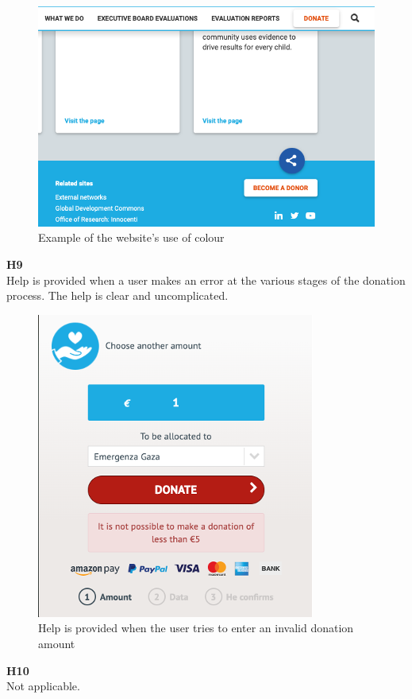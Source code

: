 \begin{description}
    \begin{figure}[htp!]
        \centering
        \includegraphics[scale=0.7]{Resources/Harry/Harry_H8.png}
        \caption{Example of the website's use of colour}
    \end{figure}
    \newpage
    \item {\textbf{H9} \color{unicefGray}{Help users recognize, diagnose and recover from errors}}\\
    Help is provided when a user makes an error at the various stages of the donation process. The help is clear and uncomplicated.
    \begin{figure}[htp!]
        \centering
        \includegraphics[scale=0.8]{Resources/Harry/Harry_H9.png}
        \caption{Help is provided when the user tries to enter an invalid donation amount}
    \end{figure}
    \item {\textbf{H10} \color{unicefGray}{Help and documentation}}\\
    Not applicable.
\end{description}
\newpage
